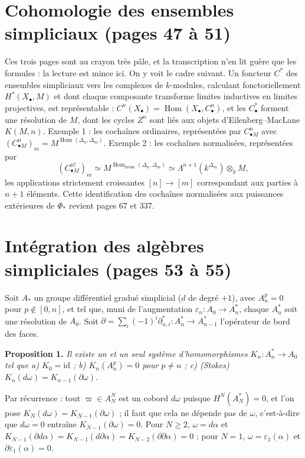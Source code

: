\documentclass[11pt,a4paper]{article}
\begin{document}
\section*{Cohomologie des ensembles simpliciaux (pages 47 à 51)}

Ces trois pages sont au crayon très pâle, et la transcription n'en lit guère
que les formules : la lecture est mince ici. On y voit le cadre suivant. Un
foncteur $C^*$ des ensembles simpliciaux vers les complexes de $k$-modules,
calculant fonctoriellement $H^*(X_\bullet, M)$ et dont chaque composante
transforme limites inductives en limites projectives, est représentable :
$C^n(X_\bullet) = \operatorname{Hom}(X_\bullet, C^n_\bullet)$, et les
$C^*_\bullet$ forment une résolution de $M$, dont les cycles $Z^n$ sont liés aux
objets d'Eilenberg–MacLane $K(M,n)$. Exemple 1 : les cochaînes ordinaires,
représentées par $C^n_{\bullet M}$ avec $(C^n_{\bullet M})_m = M^{\operatorname{Hom}
(\Delta_n, \Delta_m)}$. Exemple 2 : les cochaînes normalisées, représentées par
\[
(C^{n!}_{\bullet M})_m \simeq M^{\operatorname{Hom}_{\mathrm{mono}}(\Delta_n, \Delta_m)} \simeq \Lambda^{n+1}(k^{\Delta_m}) \otimes_k M ,
\]
les applications strictement croissantes $[n] \to [m]$ correspondant aux
parties à $n+1$ éléments. Cette identification des cochaînes normalisées aux
puissances extérieures de $\Phi_*$ revient pages 67 et 337.

\section*{Intégration des algèbres simpliciales (pages 53 à 55)}

Soit $A_*$ un groupe différentiel gradué simplicial ($d$ de degré $+1$), avec
$A^p_n = 0$ pour $p \notin [0,n]$, et tel que, muni de l'augmentation
$\varepsilon_n : A_0 \to A^*_n$, chaque $A^*_n$ soit une résolution de $A_0$.
Soit $\partial = \sum_i (-1)^i \partial^*_{n,i} : A^*_n \to A^*_{n-1}$
l'opérateur de bord des faces.

\textbf{Proposition 1.} \emph{Il existe un et un seul système d'homomorphismes
$K_n : A^*_n \to A_0$ tel que a) $K_0 = \mathrm{id}$ ; b) $K_n(A^p_n) = 0$ pour
$p \neq n$ ; c) (Stokes) $K_n(d\omega) = K_{n-1}(\partial\omega)$.}

Par récurrence : tout $\varpi \in A^N_N$ est un cobord $d\omega$ puisque
$H^N(A^*_N) = 0$, et l'on pose $K_N(d\omega) = K_{N-1}(\partial\omega)$ ; il
faut que cela ne dépende pas de $\omega$, c'est-à-dire que $d\omega = 0$
entraîne $K_{N-1}(\partial\omega) = 0$. Pour $N \geq 2$, $\omega = d\alpha$ et
$K_{N-1}(\partial d\alpha) = K_{N-1}(d\partial\alpha) = K_{N-2}(\partial\partial
\alpha) = 0$ ; pour $N = 1$, $\omega = \varepsilon_1(\alpha)$ et
$\partial\varepsilon_1(\alpha) = 0$.
\end{document}
